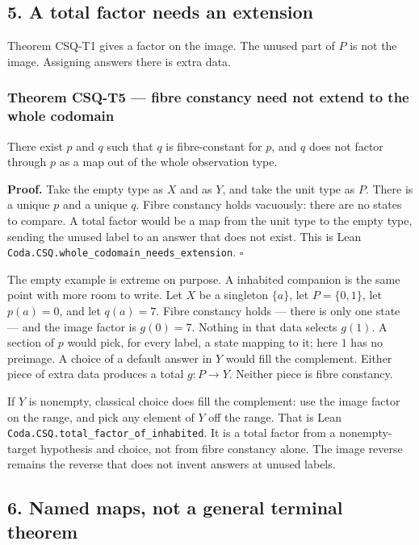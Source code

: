 \documentclass[
  11pt,
]{article}
\begin{document}
\subsection{5. A total factor needs an extension}\label{a-total-factor-needs-an-extension}

Theorem CSQ-T1 gives a factor on the image. The unused part of \(P\) is not the image. Assigning answers there is extra data.

\subsubsection{Theorem CSQ-T5 --- fibre constancy need not extend to the whole codomain}\label{theorem-csq-t5-fibre-constancy-need-not-extend-to-the-whole-codomain}

There exist \(p\) and \(q\) such that \(q\) is fibre-constant for \(p\), and \(q\) does not factor through \(p\) as a map out of the whole observation type.

\textbf{Proof.} Take the empty type as \(X\) and as \(Y\), and take the unit type as \(P\). There is a unique \(p\) and a unique \(q\). Fibre constancy holds vacuously: there are no states to compare. A total factor would be a map from the unit type to the empty type, sending the unused label to an answer that does not exist. This is Lean \nolinkurl{Coda.CSQ.whole_codomain_needs_extension}. \(\square\)

The empty example is extreme on purpose. A inhabited companion is the same point with more room to write. Let \(X\) be a singleton \(\{a\}\), let \(P=\{0,1\}\), let \(p(a)=0\), and let \(q(a)=7\). Fibre constancy holds --- there is only one state --- and the image factor is \(g(0)=7\). Nothing in that data selects \(g(1)\). A section of \(p\) would pick, for every label, a state mapping to it; here \(1\) has no preimage. A choice of a default answer in \(Y\) would fill the complement. Either piece of extra data produces a total \(g:P\to Y\). Neither piece is fibre constancy.

If \(Y\) is nonempty, classical choice does fill the complement: use the image factor on the range, and pick any element of \(Y\) off the range. That is Lean \nolinkurl{Coda.CSQ.total_factor_of_inhabited}. It is a total factor from a nonempty-target hypothesis and choice, not from fibre constancy alone. The image reverse remains the reverse that does not invent answers at unused labels.

\subsection{6. Named maps, not a general terminal theorem}\label{named-maps-not-a-general-terminal-theorem}
\end{document}
